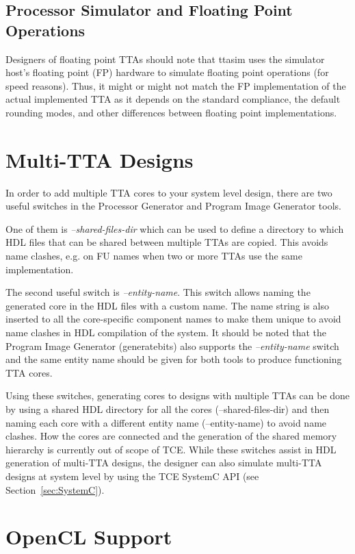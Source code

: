 \documentclass[twoside]{tceusermanual}
\begin{document}
\subsection{Processor Simulator and Floating Point Operations}

Designers of floating point TTAs should note that ttasim uses the simulator 
host's floating point (FP) hardware to simulate floating point operations (for 
speed reasons). Thus, it might or might not match the FP implementation of 
the actual implemented TTA as it depends on the standard compliance, the
default rounding modes, and other differences between floating point 
implementations.

\section{Multi-TTA Designs}

In order to add multiple TTA cores to your system level design, there are
two useful switches in the Processor Generator and Program Image Generator 
tools. 

One of them is \textit{--shared-files-dir} which can be used to define 
a directory to which HDL files that can be shared between multiple TTAs are 
copied. This avoids name clashes, e.g. on FU names when two or more TTAs 
use the same implementation. 

The second useful switch is \textit{--entity-name}. This switch allows
naming the generated core in the HDL files with a custom name. The name 
string is also inserted to all the core-specific component names to make
them unique to avoid name clashes in HDL compilation of the system. It
should be noted that the Program Image Generator (generatebits) also
supports the \textit{--entity-name} switch and the same entity name should
be given for both tools to produce functioning TTA cores.

Using these switches, generating cores to designs with multiple TTAs can
be done by using a shared HDL directory for all the cores (--shared-files-dir) 
and then naming each core with a different entity name (--entity-name) to 
avoid name clashes. How the cores are connected and the generation of
the shared memory hierarchy is currently out of scope of TCE. While
these switches assist in HDL generation of multi-TTA designs, the
designer can also simulate multi-TTA designs at system level by
using the TCE SystemC API (see Section~\ref{sec:SystemC}).

\section{OpenCL Support}
\end{document}
